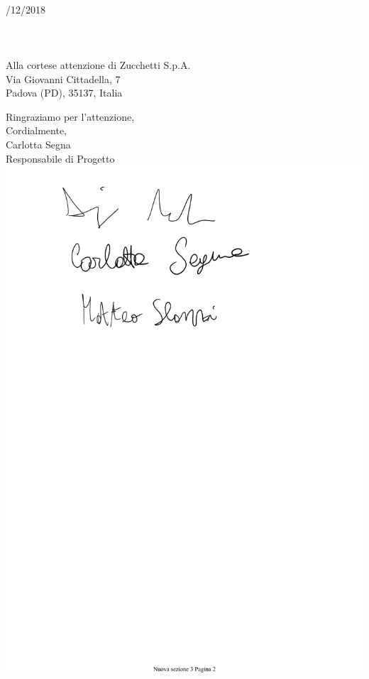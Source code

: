 \documentclass[11pt, a4paper]{letter} %
\begin{document}
\begin{letter}{
	\-\\/12/2018
	\-\\\-\\\-\\\-\\
	Alla cortese attenzione di Zucchetti S.p.A. \\
	Via Giovanni Cittadella, 7\\
	Padova (PD), 35137, Italia
}
\closing{Ringraziamo per l'attenzione,\\
Cordialmente,\\
Carlotta Segna\\
Responsabile di Progetto
\includegraphics[scale=0.4]{images/CarlottaSegna.pdf}} 





\end{letter}
\end{document}
